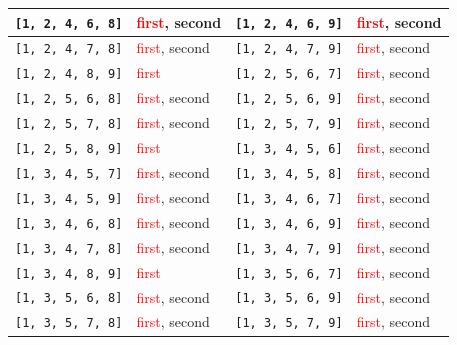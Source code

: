 \begin{longtable}{|p{3.5cm}|p{2.5cm}||p{3.5cm}|p{2.5cm}|}
\texttt{[1, 2, 4, 6, 8]} & \textcolor{red}{first}, \textcolor{CustomBlue}{second} & \texttt{[1, 2, 4, 6, 9]} & \textcolor{red}{first}, \textcolor{CustomBlue}{second} \\ \hline
\texttt{[1, 2, 4, 7, 8]} & \textcolor{red}{first}, \textcolor{CustomBlue}{second} & \texttt{[1, 2, 4, 7, 9]} & \textcolor{red}{first}, \textcolor{CustomBlue}{second} \\ \hline
\texttt{[1, 2, 4, 8, 9]} & \textcolor{red}{first} & \texttt{[1, 2, 5, 6, 7]} & \textcolor{red}{first}, \textcolor{CustomBlue}{second} \\ \hline
\texttt{[1, 2, 5, 6, 8]} & \textcolor{red}{first}, \textcolor{CustomBlue}{second} & \texttt{[1, 2, 5, 6, 9]} & \textcolor{red}{first}, \textcolor{CustomBlue}{second} \\ \hline
\texttt{[1, 2, 5, 7, 8]} & \textcolor{red}{first}, \textcolor{CustomBlue}{second} & \texttt{[1, 2, 5, 7, 9]} & \textcolor{red}{first}, \textcolor{CustomBlue}{second} \\ \hline
\texttt{[1, 2, 5, 8, 9]} & \textcolor{red}{first} & \texttt{[1, 3, 4, 5, 6]} & \textcolor{red}{first}, \textcolor{CustomBlue}{second} \\ \hline
\texttt{[1, 3, 4, 5, 7]} & \textcolor{red}{first}, \textcolor{CustomBlue}{second} & \texttt{[1, 3, 4, 5, 8]} & \textcolor{red}{first}, \textcolor{CustomBlue}{second} \\ \hline
\texttt{[1, 3, 4, 5, 9]} & \textcolor{red}{first}, \textcolor{CustomBlue}{second} & \texttt{[1, 3, 4, 6, 7]} & \textcolor{red}{first}, \textcolor{CustomBlue}{second} \\ \hline
\texttt{[1, 3, 4, 6, 8]} & \textcolor{red}{first}, \textcolor{CustomBlue}{second} & \texttt{[1, 3, 4, 6, 9]} & \textcolor{red}{first}, \textcolor{CustomBlue}{second} \\ \hline
\texttt{[1, 3, 4, 7, 8]} & \textcolor{red}{first}, \textcolor{CustomBlue}{second} & \texttt{[1, 3, 4, 7, 9]} & \textcolor{red}{first}, \textcolor{CustomBlue}{second} \\ \hline
\texttt{[1, 3, 4, 8, 9]} & \textcolor{red}{first} & \texttt{[1, 3, 5, 6, 7]} & \textcolor{red}{first}, \textcolor{CustomBlue}{second} \\ \hline
\texttt{[1, 3, 5, 6, 8]} & \textcolor{red}{first}, \textcolor{CustomBlue}{second} & \texttt{[1, 3, 5, 6, 9]} & \textcolor{red}{first}, \textcolor{CustomBlue}{second} \\ \hline
\texttt{[1, 3, 5, 7, 8]} & \textcolor{red}{first}, \textcolor{CustomBlue}{second} & \texttt{[1, 3, 5, 7, 9]} & \textcolor{red}{first}, \textcolor{CustomBlue}{second} \\ \hline

\end{longtable}
